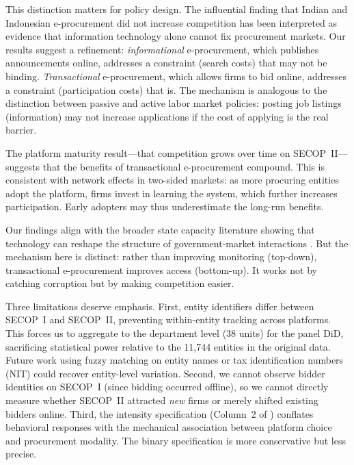 \documentclass[12pt]{article}
\begin{document}
This distinction matters for policy design. The influential \citet{lewis2016} finding that Indian and Indonesian e-procurement did not increase competition has been interpreted as evidence that information technology alone cannot fix procurement markets. Our results suggest a refinement: \textit{informational} e-procurement, which publishes announcements online, addresses a constraint (search costs) that may not be binding. \textit{Transactional} e-procurement, which allows firms to bid online, addresses a constraint (participation costs) that is. The mechanism is analogous to the distinction between passive and active labor market policies: posting job listings (information) may not increase applications if the cost of applying is the real barrier.

The platform maturity result---that competition grows over time on SECOP~II---suggests that the benefits of transactional e-procurement compound. This is consistent with network effects in two-sided markets: as more procuring entities adopt the platform, firms invest in learning the system, which further increases participation. Early adopters may thus underestimate the long-run benefits.

Our findings align with the broader state capacity literature showing that technology can reshape the structure of government-market interactions \citep{muralidharan2016, banerjee2020, best2023}. But the mechanism here is distinct: rather than improving monitoring (top-down), transactional e-procurement improves access (bottom-up). It works not by catching corruption but by making competition easier.

Three limitations deserve emphasis. First, entity identifiers differ between SECOP~I and SECOP~II, preventing within-entity tracking across platforms. This forces us to aggregate to the department level (38 units) for the panel DiD, sacrificing statistical power relative to the 11,744 entities in the original data. Future work using fuzzy matching on entity names or tax identification numbers (NIT) could recover entity-level variation. Second, we cannot observe bidder identities on SECOP~I (since bidding occurred offline), so we cannot directly measure whether SECOP~II attracted \textit{new} firms or merely shifted existing bidders online. Third, the intensity specification (Column~2 of ) conflates behavioral responses with the mechanical association between platform choice and procurement modality. The binary specification is more conservative but less precise.
\end{document}
